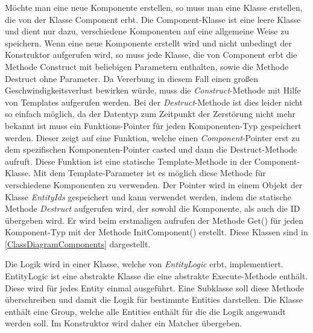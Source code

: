 Möchte man eine neue Komponente erstellen, so muss man eine Klasse erstellen, die von der Klasse Component erbt. Die Component-Klasse ist eine leere Klasse und dient nur dazu, verschiedene Komponenten auf eine allgemeine Weise zu speichern.  %
Wenn eine neue Komponente erstellt wird und nicht unbedingt der Konstruktor aufgerufen wird, so muss jede Klasse, die von Component erbt die Methode Construct mit beliebigen Parametern enthalten, sowie die Methode Destruct ohne Parameter. %
Da Vererbung in diesem Fall einen großen Geschwindigkeitsverlust bewirken würde, muss die \textit{Construct}-Methode mit Hilfe von Templates aufgerufen werden. Bei der \textit{Destruct}-Methode ist dies leider nicht so einfach möglich, da der Datentyp zum Zeitpunkt der Zerstörung nicht mehr bekannt ist muss ein Funktions-Pointer für jeden Komponenten-Typ gespeichert werden. Dieser zeigt auf eine Funktion, welche einen \textit{Component}-Pointer erst zu dem spezifischen Komponenten-Pointer casted und dann die Destruct-Methode aufruft. Diese Funktion ist eine statische Template-Methode in der Component-Klasse. Mit dem Template-Parameter ist es möglich diese Methode für verschiedene Komponenten zu verwenden. Der Pointer wird in einem Objekt der Klasse \textit{EntityIds} gespeichert und kann verwendet werden, indem die statische Methode \textit{Destruct} aufgerufen wird, der sowohl die Komponente, als auch die ID übergeben wird. 
Er wird beim erstmaligen aufrufen der Methode Get() für jeden Komponent-Typ mit der Methode InitComponent() erstellt. Diese Klassen sind in \cref{ClassDiagramComponents} dargestellt.

Die Logik wird in einer Klasse, welche von \textit{EntityLogic} erbt, implementiert. EntityLogic ist eine abstrakte Klasse die eine abstrakte Execute-Methode enthält. Diese wird für jedes Entity einmal ausgeführt. Eine Subklasse soll diese Methode überschreiben und damit die Logik für bestimmte Entities darstellen. Die Klasse enthält eine Group, welche alle Entities enthält für die die Logik angewandt werden soll. Im Konstruktor wird daher ein Matcher übergeben.